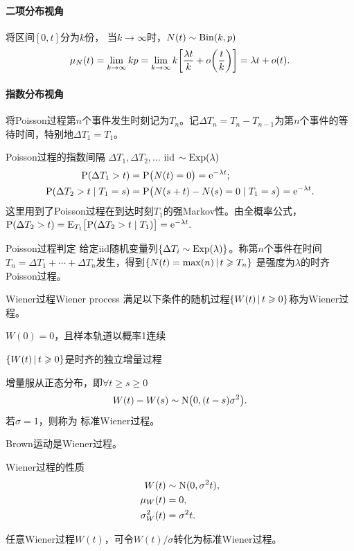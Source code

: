 \paragraph{二项分布视角}
将区间$ [0, t] $分为$ k $份，
当$k \to \infty$时，$N(t) \sim \operatorname{Bin}(k,p)$
\[
	\mu_N(t) = \lim_{k\to\infty}kp = \lim_{k\to\infty}k\biggl[\frac{\lambda t}k + o\biggl(\frac tk\biggr)\biggr] = \lambda t + o(t).
\]
\paragraph{指数分布视角}
将Poisson过程第$ n $个事件发生时刻记为$ T_n$。记$\Delta T_n = T_n - T_{n-1} $为第$ n $个事件的等待时间，特别地$\Delta T_1 = T_1$。
\begin{theorem}{Poisson过程的指数间隔}{}
	$\Delta T_1,\Delta T_2,\ldots$ iid $\sim \operatorname{Exp}(\lambda)$
	\begin{align*}
		\operatorname{P}(\Delta T_1 > t) &= \operatorname{P}\bigl(N(t) = 0\bigr) = \mathop{}\!\mathrm{e}^{-\lambda t};\\
		\operatorname{P}(\Delta T_2 > t \mid T_1 = s) &= \operatorname{P}\bigl(N(s + t) - N(s) = 0 \mid T_1 = s\bigr) = \mathop{}\!\mathrm{e}^{-\lambda t}.
	\end{align*}
	这里用到了Poisson过程在到达时刻$T_1$的强Markov性。由全概率公式，$\operatorname{P}(\Delta T_2 > t) = \operatorname{E}_{T_1}\bigl[\operatorname{P}(\Delta T_2 > t \mid T_1)\bigr] = \mathop{}\!\mathrm{e}^{-\lambda t}.$
\end{theorem}
\begin{theorem}{Poisson过程判定}{}
	给定iid随机变量列$\{\Delta T_i \sim \operatorname{Exp}(\lambda)\}$。称第$ n $个事件在时间$T_n = \Delta T_1 + \cdots + \Delta T_n $发生，得到$\{N(t) = \max(n)\,\vert\,t \geqslant T_n\}$
	是强度为$\lambda$的时齐Poisson过程。
\end{theorem}
\begin{definition}{Wiener过程}{Wiener process}
	满足以下条件的随机过程$\{W(t)\,\vert\,t \geqslant 0\}$称为Wiener过程。
	\begin{compactitem}
		\item $W(0) = 0$，且样本轨道以概率1连续
		\item $\{W(t)\,\vert\,t \geqslant 0\}$是时齐的独立增量过程
		\item 增量服从正态分布，即$\forall t \geqslant s \geqslant 0$
		\begin{equation}\label{eq:ps-wiener-increments}
			W(t) - W(s) \sim \operatorname{N}\bigl(0,(t - s)\sigma^2\bigr).
		\end{equation}
		若$\sigma = 1$，则称为 标准Wiener过程。
	\end{compactitem}
\end{definition}
Brown运动是Wiener过程。
\begin{theorem}{Wiener过程的性质}{}
	\begin{equation}\label{eq:ps-wiener-moments}
	    \begin{aligned}
			W(t) &\sim \operatorname{N}(0,\sigma^2t),\\
			\mu_W(t) &= 0,\\
			\sigma^2_W(t) &= \sigma^2t.
	    \end{aligned}
	\end{equation}
\end{theorem}
任意Wiener过程$W(t)$，可令$W(t)/\sigma$转化为标准Wiener过程。


